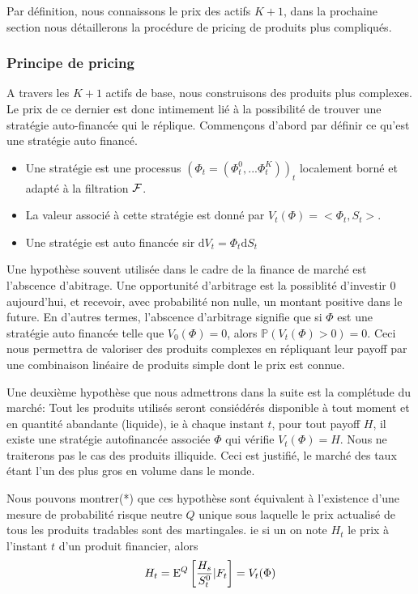 Par définition, nous connaissons le prix des actifs $K+1$, dans la prochaine section nous détaillerons la procédure de pricing de produits plus compliqués.



\subsubsection{Principe de pricing}
A travers les $K+1$ actifs de base, nous construisons des produits plus complexes. 
Le prix de ce dernier est donc intimement lié à la possibilité de trouver une stratégie auto-financée qui le réplique.
Commençons d'abord par définir ce qu'est une stratégie auto financé.

\begin{defn}
  \begin{itemize}
  \item Une stratégie est une processus $(\Phi_t = (\Phi^0_t, ... \Phi^K_t))_t$ localement borné et adapté à la filtration $\cal{F}$.
  \item La valeur associé à cette stratégie est donné par $V_t(\Phi) = <\Phi_t, S_t>$.
  \item Une stratégie est auto financée sir $\mathrm{d}V_t = \Phi_t \mathrm{d}S_t$
  \end{itemize}

\end{defn}

Une hypothèse souvent utilisée dans le cadre de la finance de marché est l'abscence d'abitrage. Une opportunité d'arbitrage est la possiblité d'investir 0 aujourd'hui, et recevoir, avec probabilité non nulle, un montant positive dans le future. En d'autres termes, l'abscence d'arbitrage signifie que si $\Phi$ est une stratégie auto financée telle que $V_0(\Phi) = 0$, alors $\mathbb{P} ( V_t(\Phi) > 0 ) = 0$. Ceci nous permettra de valoriser des produits complexes en répliquant leur payoff par une combinaison linéaire de produits simple dont le prix est connue.

Une deuxième hypothèse que nous admettrons dans la suite est la complétude du marché: Tout les produits utilisés seront consiédérés disponible à tout moment et en quantité abandante (liquide), ie à chaque instant $t$, pour tout payoff $H$, il existe une stratégie autofinancée associée $\Phi$ qui vérifie $V_t( \Phi ) = H$. Nous ne traiterons pas le cas des produits illiquide. Ceci est justifié, le marché des taux étant l'un des plus gros en volume dans le monde.

Nous pouvons montrer(*) que ces hypothèse sont équivalent à l'existence d'une mesure de probabilité risque neutre $Q$ unique sous laquelle le prix actualisé de tous les produits tradables sont des martingales. ie si un on note $H_t$ le prix à l'instant $t$ d'un produit financier, alors
$$H_t =\mathrm{E}^Q \left[  \frac{H_s}{S^0_t} | F_t  \right] = V_t(\Phi)$$

